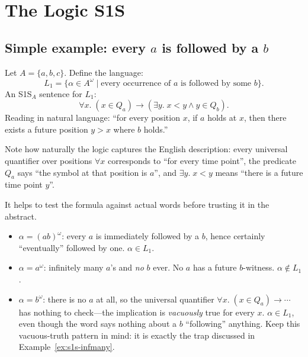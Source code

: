 \section{The Logic S1S}
\label{sec:s1s-def}

\subsection{Simple example: every \texorpdfstring{$a$}{a} is followed by a \texorpdfstring{$b$}{b}}
\label{sec:s1s-ex1}

\begin{example}
Let $A = \{a, b, c\}$.  Define the language:
\[
  L_1 = \{\alpha \in A^\omega \mid
          \text{every occurrence of } a \text{ is followed by some } b\}.
\]
An S1S$_A$ sentence for $L_1$:
\[
  \forall x.\; (x \in Q_a) \to (\exists y.\; x < y \land y \in Q_b).
\]
Reading in natural language: ``for every position $x$, if $a$ holds at
$x$, then there exists a future position $y > x$ where $b$ holds.''
\end{example}

Note how naturally the logic captures the English description: every
universal quantifier over positions $\forall x$ corresponds to ``for
every time point'', the predicate $Q_a$ says ``the symbol at that
position is $a$'', and $\exists y.\; x < y$ means ``there is a future
time point $y$''.

\begin{example}
\label{ex:s1s-l1-words}
It helps to test the formula against actual words before trusting it in
the abstract.
\begin{itemize}
  \item $\alpha = (ab)^\omega$: every $a$ is immediately followed by a
        $b$, hence certainly ``eventually'' followed by one.
        $\alpha \in L_1$.
  \item $\alpha = a^\omega$: infinitely many $a$'s and \emph{no} $b$
        ever.  No $a$ has a future $b$-witness.  $\alpha \notin L_1$.
  \item $\alpha = b^\omega$: there is no $a$ at all, so the universal
        quantifier $\forall x.\;(x \in Q_a) \to \cdots$ has nothing to
        check---the implication is \emph{vacuously} true for every $x$.
        $\alpha \in L_1$, even though the word says nothing about a $b$
        ``following'' anything.  Keep this vacuous-truth pattern in
        mind: it is exactly the trap discussed in
        Example~\ref{ex:s1s-infmany}.
\end{itemize}
\end{example}

